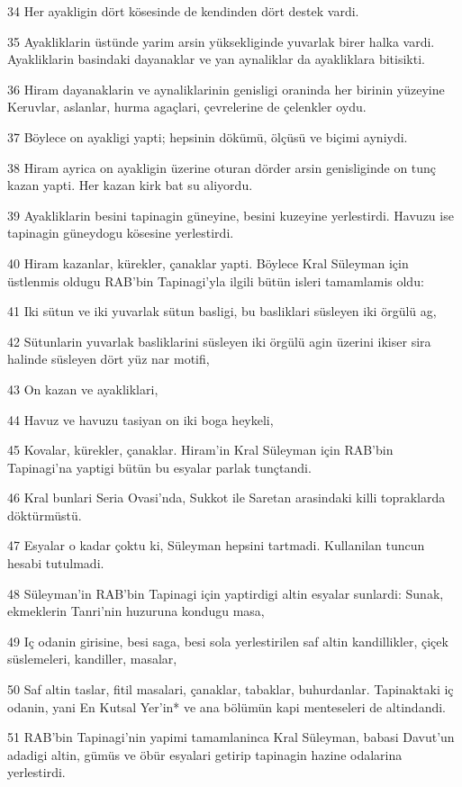 \par 34 Her ayakligin dört kösesinde de kendinden dört destek vardi.
\par 35 Ayakliklarin üstünde yarim arsin yüksekliginde yuvarlak birer halka vardi. Ayakliklarin basindaki dayanaklar ve yan aynaliklar da ayakliklara bitisikti.
\par 36 Hiram dayanaklarin ve aynaliklarinin genisligi oraninda her birinin yüzeyine Keruvlar, aslanlar, hurma agaçlari, çevrelerine de çelenkler oydu.
\par 37 Böylece on ayakligi yapti; hepsinin dökümü, ölçüsü ve biçimi ayniydi.
\par 38 Hiram ayrica on ayakligin üzerine oturan dörder arsin genisliginde on tunç kazan yapti. Her kazan kirk bat su aliyordu.
\par 39 Ayakliklarin besini tapinagin güneyine, besini kuzeyine yerlestirdi. Havuzu ise tapinagin güneydogu kösesine yerlestirdi.
\par 40 Hiram kazanlar, kürekler, çanaklar yapti. Böylece Kral Süleyman için üstlenmis oldugu RAB'bin Tapinagi'yla ilgili bütün isleri tamamlamis oldu:
\par 41 Iki sütun ve iki yuvarlak sütun basligi, bu basliklari süsleyen iki örgülü ag,
\par 42 Sütunlarin yuvarlak basliklarini süsleyen iki örgülü agin üzerini ikiser sira halinde süsleyen dört yüz nar motifi,
\par 43 On kazan ve ayakliklari,
\par 44 Havuz ve havuzu tasiyan on iki boga heykeli,
\par 45 Kovalar, kürekler, çanaklar. Hiram'in Kral Süleyman için RAB'bin Tapinagi'na yaptigi bütün bu esyalar parlak tunçtandi.
\par 46 Kral bunlari Seria Ovasi'nda, Sukkot ile Saretan arasindaki killi topraklarda döktürmüstü.
\par 47 Esyalar o kadar çoktu ki, Süleyman hepsini tartmadi. Kullanilan tuncun hesabi tutulmadi.
\par 48 Süleyman'in RAB'bin Tapinagi için yaptirdigi altin esyalar sunlardi: Sunak, ekmeklerin Tanri'nin huzuruna kondugu masa,
\par 49 Iç odanin girisine, besi saga, besi sola yerlestirilen saf altin kandillikler, çiçek süslemeleri, kandiller, masalar,
\par 50 Saf altin taslar, fitil masalari, çanaklar, tabaklar, buhurdanlar. Tapinaktaki iç odanin, yani En Kutsal Yer'in* ve ana bölümün kapi menteseleri de altindandi.
\par 51 RAB'bin Tapinagi'nin yapimi tamamlaninca Kral Süleyman, babasi Davut'un adadigi altin, gümüs ve öbür esyalari getirip tapinagin hazine odalarina yerlestirdi.

